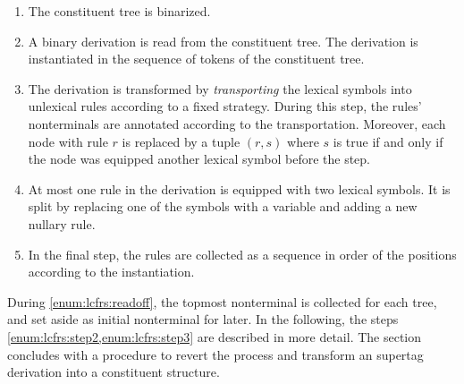 \documentclass[../../document.tex]{subfiles}
\begin{document}
    \begin{enumerate}
        \item The constituent tree is binarized.
        \item\label{enum:lcfrs:readoff}
            A binary  derivation is read from the constituent tree.
            The derivation is instantiated in the sequence of tokens of the constituent tree.
        \item\label{enum:lcfrs:step2}
            The derivation is transformed by \emph{transporting} the lexical symbols into unlexical rules according to a fixed strategy.
            During this step, the rules'  nonterminals are annotated according to the transportation.
            Moreover, each node with rule \(r\) is replaced by a tuple \((r, s)\) where \(s\) is true if and only if the node was equipped another lexical symbol before the step.
        \item\label{enum:lcfrs:step3}
            At most one rule in the derivation is equipped with two lexical symbols.
            It is split by replacing one of the symbols with a variable and adding a new nullary rule.
        \item
            In the final step, the rules are collected as a sequence in order of the positions according to the instantiation.
    \end{enumerate}
    During \cref{enum:lcfrs:readoff}, the topmost  nonterminal is collected for each tree, and set aside as initial nonterminal for later.
    In the following, the steps \cref{enum:lcfrs:step2,enum:lcfrs:step3} are described in more detail.
    The section concludes with a procedure to revert the process and transform an  supertag derivation into a constituent structure.
\end{document}
